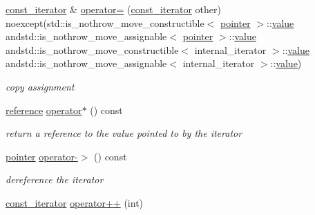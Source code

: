 \begin{DoxyCompactItemize}
\hyperlink{classnlohmann_1_1basic__json_1_1const__iterator}{const\-\_\-iterator} \& \hyperlink{classnlohmann_1_1basic__json_1_1const__iterator_adb91f1fc32926a0ac7a5eeaa47175642}{operator=} (\hyperlink{classnlohmann_1_1basic__json_1_1const__iterator}{const\-\_\-iterator} other) noexcept(std\-::is\-\_\-nothrow\-\_\-move\-\_\-constructible$<$ \hyperlink{classnlohmann_1_1basic__json_1_1const__iterator_a1da96fc3054d547e7706d3a2f073f389}{pointer} $>$\-::\hyperlink{classnlohmann_1_1basic__json_1_1const__iterator_ac75e80d30b6169ee2a29ec93fb4d2acd}{value} andstd\-::is\-\_\-nothrow\-\_\-move\-\_\-assignable$<$ \hyperlink{classnlohmann_1_1basic__json_1_1const__iterator_a1da96fc3054d547e7706d3a2f073f389}{pointer} $>$\-::\hyperlink{classnlohmann_1_1basic__json_1_1const__iterator_ac75e80d30b6169ee2a29ec93fb4d2acd}{value} andstd\-::is\-\_\-nothrow\-\_\-move\-\_\-constructible$<$ internal\-\_\-iterator $>$\-::\hyperlink{classnlohmann_1_1basic__json_1_1const__iterator_ac75e80d30b6169ee2a29ec93fb4d2acd}{value} andstd\-::is\-\_\-nothrow\-\_\-move\-\_\-assignable$<$ internal\-\_\-iterator $>$\-::\hyperlink{classnlohmann_1_1basic__json_1_1const__iterator_ac75e80d30b6169ee2a29ec93fb4d2acd}{value})
\begin{DoxyCompactList}\small\item\em copy assignment \end{DoxyCompactList}\item 
\hyperlink{classnlohmann_1_1basic__json_1_1const__iterator_aefd248cac6493eed1e6ff53ba6a63eb2}{reference} \hyperlink{classnlohmann_1_1basic__json_1_1const__iterator_ab3029a1a83cf46dc28ad443bbad0c74d}{operator$\ast$} () const 
\begin{DoxyCompactList}\small\item\em return a reference to the value pointed to by the iterator \end{DoxyCompactList}\item 
\hyperlink{classnlohmann_1_1basic__json_1_1const__iterator_a1da96fc3054d547e7706d3a2f073f389}{pointer} \hyperlink{classnlohmann_1_1basic__json_1_1const__iterator_a8be837e4d902887676dd837abe9098d3}{operator-\/$>$} () const 
\begin{DoxyCompactList}\small\item\em dereference the iterator \end{DoxyCompactList}\item 
\hyperlink{classnlohmann_1_1basic__json_1_1const__iterator}{const\-\_\-iterator} \hyperlink{classnlohmann_1_1basic__json_1_1const__iterator_a8dbaec5bf8ccba3225520356629061cb}{operator++} (int)

\end{DoxyCompactItemize}
